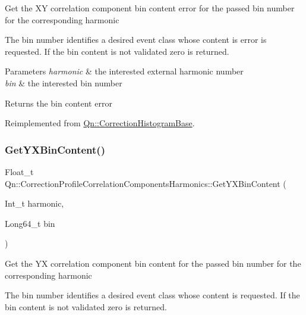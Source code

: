 Get the XY correlation component bin content error for the passed bin number for the corresponding harmonic

The bin number identifies a desired event class whose content is error is requested. If the bin content is not validated zero is returned.


\begin{DoxyParams}{Parameters}
{\em harmonic} & the interested external harmonic number \\
\hline
{\em bin} & the interested bin number \\
\hline
\end{DoxyParams}
\begin{DoxyReturn}{Returns}
the bin content error 
\end{DoxyReturn}


Reimplemented from \mbox{\hyperlink{classQn_1_1CorrectionHistogramBase_afcd23dbf89783fd907ccbe90ca4a776b}{Qn\+::\+Correction\+Histogram\+Base}}.

\mbox{\label{classQn_1_1CorrectionProfileCorrelationComponentsHarmonics_a14b776082f56bec058ef29e6ae69fed1}} 
\subsubsection{\texorpdfstring{Get\+Y\+X\+Bin\+Content()}{GetYXBinContent()}}
{\footnotesize\ttfamily Float\+\_\+t Qn\+::\+Correction\+Profile\+Correlation\+Components\+Harmonics\+::\+Get\+Y\+X\+Bin\+Content (\begin{DoxyParamCaption}\item[{Int\+\_\+t}]{harmonic,  }\item[{Long64\+\_\+t}]{bin }\end{DoxyParamCaption})\hspace{0.3cm}{\ttfamily [virtual]}}

Get the YX correlation component bin content for the passed bin number for the corresponding harmonic

The bin number identifies a desired event class whose content is requested. If the bin content is not validated zero is returned.


